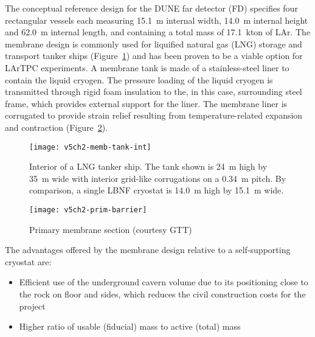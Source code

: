 The conceptual reference design for the DUNE far detector (FD) %
 specifies four   %
rectangular vessels each measuring 15.1~m internal width, 14.0~m internal 
height and 62.0~m internal length, and containing a total mass of 
17.1~kton of LAr. The membrane design is commonly 
used for liquified natural gas (LNG) storage and transport 
tanker ships (Figure~\ref{fig:memb-tank-int}) and has been 
proven to be a viable option for LArTPC experiments. 
A membrane tank 
is made of a stainless-steel liner to contain the liquid cryogen. 
The pressure loading of the liquid cryogen is transmitted 
through rigid foam insulation to the, in this case, surrounding steel frame, 
which provides external support for the liner. The membrane 
liner is corrugated to provide strain relief resulting from 
temperature-related expansion and contraction (Figure~\ref{fig:prim-barrier}).

\begin{figure}[htbp]
\centering
\texttt{[image: v5ch2-memb-tank-int]}
\caption[Interior of a LNG tanker ship]{Interior of a LNG tanker ship. 
The tank shown is 24~m high by 35~m wide with interior grid-like 
corrugations on a 0.34~m pitch. By comparison, a single LBNF 
cryostat is %
14.0~m high by 15.1~m wide.}
\label{fig:memb-tank-int}
\end{figure}

\begin{figure}[htbp]
\centering
\texttt{[image: v5ch2-prim-barrier]}
\caption[Primary membrane section]{Primary membrane section (courtesy GTT)}
\label{fig:prim-barrier}
\end{figure}

The advantages offered by the membrane design relative to a self-supporting cryostat are:
\begin{itemize}
\item Efficient use of the underground cavern volume due to its positioning 
close to the rock on floor and sides, which reduces the civil construction 
costs for the project
\item Higher ratio of usable (fiducial) mass to active (total) mass
\end{itemize}

